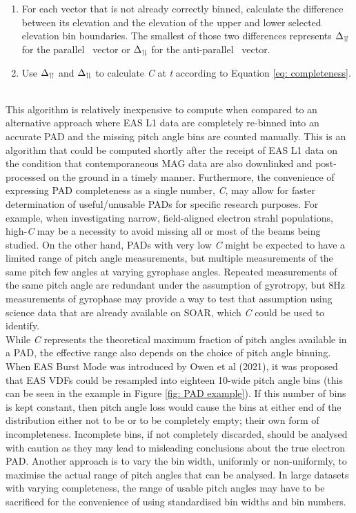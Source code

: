 \begin{enumerate}
    \item For each vector that is not already correctly binned, calculate the difference between its elevation and the elevation of the upper and lower selected elevation bin boundaries. The smallest of those two differences represents \(\Delta_{\upharpoonleft \! \upharpoonright}\) for the parallel \Bmag\ vector or \(\Delta_{\upharpoonleft \! \downharpoonright}\) for the anti-parallel \Bmag\ vector.

    \item Use \(\Delta_{\upharpoonleft \! \upharpoonright}\) and \(\Delta_{\upharpoonleft \! \downharpoonright}\) to calculate \textit{C} at \textit{t} according to Equation \ref{eq: completeness}.
\end{enumerate}
\\

\noindent This algorithm is relatively inexpensive to compute when compared to an alternative approach where EAS L1 data are completely re-binned into an accurate PAD and the missing pitch angle bins are counted manually. This is an algorithm that could be computed shortly after the receipt of EAS L1 data on the condition that contemporaneous MAG data are also downlinked and post-processed on the ground in a timely manner. Furthermore, the convenience of expressing PAD completeness as a single number, \textit{C}, may allow for faster determination of useful/unusable PADs for specific research purposes. For example, when investigating narrow, field-aligned electron strahl populations, high-\textit{C} may be a necessity to avoid missing all or most of the beams being studied. On the other hand, PADs with very low \textit{C} might be expected to have a limited range of pitch angle measurements, but multiple measurements of the same pitch few angles at varying gyrophase angles. Repeated measurements of the same pitch angle are redundant under the assumption of gyrotropy, but 8Hz measurements of gyrophase may provide a way to test that assumption using science data that are already available on SOAR, which \textit{C} could be used to identify\cite{owen2021}.
\\

While \textit{C} represents the theoretical maximum fraction of pitch angles available in a PAD, the effective range also depends on the choice of pitch angle binning. When EAS Burst Mode was introduced by Owen et al (2021), it was proposed that EAS VDFs could be resampled into eighteen 10\degree-wide pitch angle bins (this can be seen in the example in Figure \ref{fig: PAD example})\cite{owen2021}. If this number of bins is kept constant, then pitch angle loss would cause the bins at either end of the distribution either not to be  or to be completely empty; their own form of incompleteness. Incomplete bins, if not completely discarded, should be analysed with caution as they may lead to misleading conclusions about the true electron PAD. Another approach is to vary the bin width, uniformly or non-uniformly, to maximise the actual range of pitch angles that can be analysed. In large datasets with varying completeness, the range of usable pitch angles may have to be sacrificed for the convenience of using standardised bin widths and bin numbers.
\\

